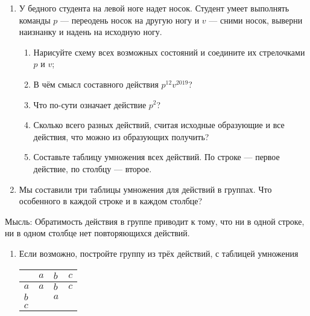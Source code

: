 \documentclass[a4paper, 12pt]{article}
\begin{document}
\begin{enumerate}
  \item У бедного студента на левой ноге надет носок. Студент умеет выполнять команды $p$ — переодень носок на другую ногу и $v$ — сними носок, выверни наизнанку и надень на исходную ногу.     
    \begin{enumerate}
      \item Нарисуйте схему всех возможных состояний и соедините их стрелочками $p$ и $v$;
      \item В чём смысл составного действия $p^{12}v^{2019}$?
      \item Что по-сути означает действие $p^2$?
      \item Сколько всего разных действий, считая исходные образующие и все действия, что можно из образующих получить?
      \item Составьте таблицу умножения всех действий. По строке — первое действие, по столбцу — второе.
    \end{enumerate}

  \item Мы составили три таблицы умножения для действий в группах. Что особенного в каждой строке и в каждом столбце?


\end{enumerate}

Мысль: Обратимость действия в группе приводит к тому, что ни в одной строке, ни в одном столбце нет повторяющихся действий.

\begin{enumerate}[resume]
  \item Если возможно, постройте группу из трёх действий, с таблицей умножения
\begin{tabular}{@{}llll@{}}
\toprule
 & $a$ & $b$ & $c$   \\ \midrule
$a$ & $a$  & $b$ & $c$   \\
$b$ &  & $a$ &    \\
$c$ &  &  &    \\ \bottomrule
\end{tabular}
\end{enumerate}
\end{document}
